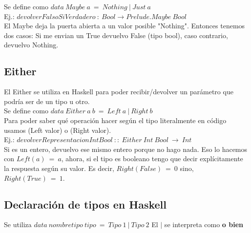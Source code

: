 \documentclass[10pt,a4paper]{article}
\begin{document}
Se define como $data \ Maybe \ a \ = \ Nothing \ | \ Just \ a$ \\

Ej.: $ devolverFalsoSiVerdadero \:: \ Bool \rightarrow Prelude.Maybe \ Bool $ \\

El Maybe deja la puerta abierta a un valor posible "Nothing". Entonces tenemos dos casos: Si me envian un True devuelvo False (tipo bool), caso contrario, devuelvo Nothing. 

\subsection*{Either}
El Either se utiliza en Haskell para poder recibir/devolver un parámetro que podría ser de un tipo u otro. \\
Se define como $ data \ Either \ a \ b \ = \ Left \ a \ | \ Right \ b $ \\

Para poder saber qué operación hacer según el tipo literalmente en código usamos (Left valor) o (Right valor). \\

Ej.: $ devolverRepresentacionIntBool \ :: \ Either \ Int \ Bool \ \rightarrow \ Int $ \\

Si es un entero, devuelvo ese mismo entero porque no hago nada. Eso lo hacemos con $Left(a) \ = \ a$, ahora, si el tipo es booleano tengo que decir explícitamente la respuesta según su valor. Es decir, $Right(False) \ = \ 0$ sino, $Right(True) \ = \ 1$.

\subsection*{Declaración de tipos en Haskell}
Se utiliza $data \ nombretipo \ tipo \ = \ Tipo \ 1 \ | \ Tipo \ 2$ 
El $|$ se interpreta como \textbf{o bien}
\end{document}
